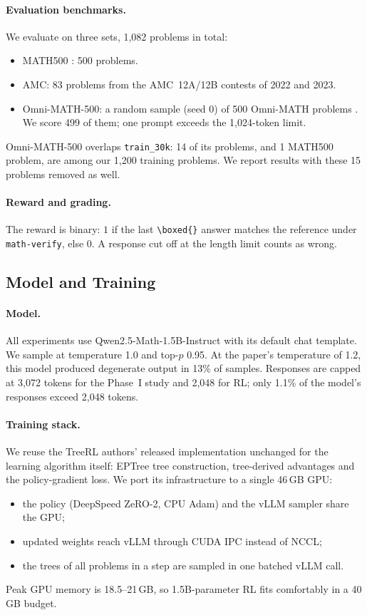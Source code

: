 \paragraph{Evaluation benchmarks.}
We evaluate on three sets, 1{,}082 problems in total:
\begin{itemize}
\item MATH500 \citep{hendrycks2021math,lightman2023verify}: 500 problems.
\item AMC: 83 problems from the AMC~12A/12B contests of 2022 and 2023.
\item Omni-MATH-500: a random sample (seed 0) of 500 Omni-MATH problems \citep{gao2024omnimath}. We score 499 of them; one prompt exceeds the 1{,}024-token limit.
\end{itemize}

Omni-MATH-500 overlaps \texttt{train\_30k}: 14 of its problems, and 1 MATH500 problem, are among our 1{,}200 training problems. We report results with these 15 problems removed as well.

\paragraph{Reward and grading.}
The reward is binary: $1$ if the last \verb|\boxed{}| answer matches the reference under \texttt{math-verify}, else $0$. A response cut off at the length limit counts as wrong.

\subsection{Model and Training}
\label{sec:training}

\paragraph{Model.}
All experiments use Qwen2.5-Math-1.5B-Instruct \citep{yang2024qwen25math} with its default chat template. We sample at temperature 1.0 and top-$p$ 0.95. At the paper's temperature of 1.2, this model produced degenerate output in 13\% of samples. Responses are capped at 3{,}072 tokens for the Phase~I study and 2{,}048 for RL; only 1.1\% of the model's responses exceed 2{,}048 tokens.

\paragraph{Training stack.}
We reuse the TreeRL authors' released implementation unchanged for the learning algorithm itself: EPTree tree construction, tree-derived advantages and the policy-gradient loss. We port its infrastructure to a single 46\,GB GPU:
\begin{itemize}
\item the policy (DeepSpeed ZeRO-2, CPU Adam) and the vLLM sampler share the GPU;
\item updated weights reach vLLM through CUDA IPC instead of NCCL;
\item the trees of all problems in a step are sampled in one batched vLLM call.
\end{itemize}
Peak GPU memory is 18.5--21\,GB, so 1.5B-parameter RL fits comfortably in a 40\,GB budget.

